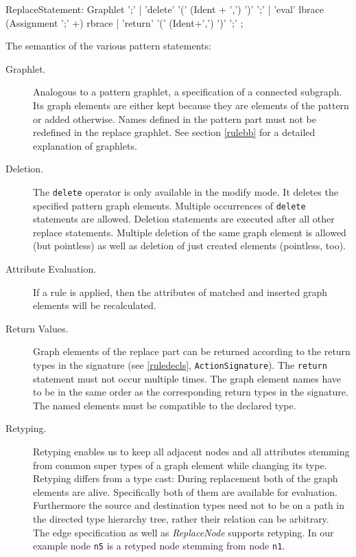 \begin{rail}  
  ReplaceStatement: Graphlet ';' |
    'delete' '(' (Ident + ',') ')' ';' |
    'eval' lbrace (Assignment ';' +) rbrace |
    'return' '(' (Ident+',') ')' ';' ;
\end{rail}    
The semantics of the various pattern statements:
\begin{description}
  \item[Graphlet.] Analogous to a pattern graphlet, a specification of a connected subgraph. Its graph elements are either kept because they are elements of the pattern or added otherwise. Names defined in the pattern part must not be redefined in the replace graphlet. See section \ref{rulebb} for a detailed explanation of graphlets. 
  \item[Deletion.] The \texttt{delete} operator is only available in the modify mode. It deletes the specified pattern graph elements. Multiple occurrences of \texttt{delete} statements are allowed. Deletion statements are executed after all other replace statements. Multiple deletion of the same graph element is allowed (but pointless) as well as deletion of just created elements (pointless, too).
  \item[Attribute Evaluation.] If a rule is applied, then the attributes of matched and inserted graph elements will be recalculated.
  \item[Return Values.] Graph elements of the replace part can be returned according to the return types in the signature (see \ref{ruledecls}, \texttt{ActionSignature}). The \texttt{return} statement must not occur multiple times. The graph element names have to be in the same order as the corresponding return types in the signature. The named elements must be compatible to the declared type.
  \item[Retyping.] Retyping enables us to keep all adjacent nodes and all attributes stemming from common super types of a graph element while changing its type. Retyping differs from a type cast: During replacement both of the graph elements are alive. Specifically both of them are available for evaluation. Furthermore the source and destination types need not to be on a path in the directed type hierarchy tree, rather their relation can be arbitrary.\\
The edge specification as well as \emph{ReplaceNode} supports retyping. In our example node \texttt{n5} is a retyped node stemming from node \texttt{n1}.
\end{description} 

